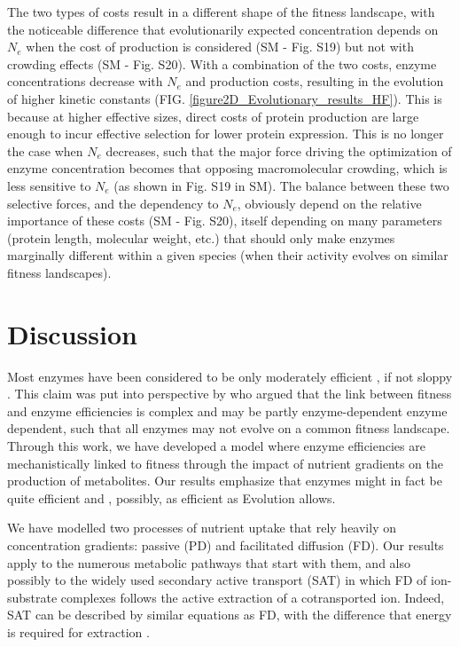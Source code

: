 \documentclass[11pt,onecolumn]{article}
\providecommand{\DIFadd}[1]{{\protect\color{blue} \sf #1}} %
\providecommand{\DIFdel}[1]{{\protect\color{red} \scriptsize #1}} %
\providecommand{\DIFaddbegin}{} %
\providecommand{\DIFaddend}{} %
\providecommand{\DIFdelbegin}{} %
\providecommand{\DIFdelend}{} %
\begin{document}
\DIFadd{The two types of costs result in a different shape of the fitness landscape, with the noticeable difference that evolutionarily expected concentration depends on $N_e$ when the cost of production is considered (SM - Fig. S19) but not with crowding effects (SM - Fig. S20). With a combination of the two costs, enzyme concentrations decrease with $N_e$ and production costs, resulting in the evolution of higher kinetic constants (FIG. \ref{figure2D_Evolutionary_results_HF}). This is because at higher effective sizes, direct costs of protein production are large enough to incur effective selection for lower protein expression. This is no longer the case when $N_e$ decreases, such that the major force driving the optimization of enzyme concentration becomes that opposing macromolecular crowding, which is less sensitive to $N_e$ (as shown in Fig. S19 in SM). The balance between these two selective forces, and the dependency to $N_e$, obviously depend on the relative importance of these costs (SM - Fig. S20), itself depending on many parameters (protein length, molecular weight, etc.) that should only make enzymes marginally different within a given species (when their activity evolves on similar fitness landscapes).
}

\DIFaddend \section{Discussion\label{sec:Discussion}}

Most enzymes have been considered to be only moderately efficient \DIFaddbegin \DIFadd{\citep{Bar-Even11}}\DIFaddend , if not sloppy \DIFdelbegin \DIFdel{\citep{Bar-Even11,Bar-Even15}}\DIFdelend \DIFaddbegin \DIFadd{\citep{Bar-Even15}}\DIFaddend . This claim was put into perspective by \citet{Newton18} who argued that the link between fitness and enzyme efficiencies is complex and may be partly \DIFdelbegin \DIFdel{enzyme-dependent}\DIFdelend \DIFaddbegin \DIFadd{enzyme dependent, such that all enzymes may not evolve on a common fitness landscape}\DIFaddend . Through this work, we have developed a model where enzyme efficiencies are mechanistically linked to fitness through the impact of nutrient gradients on the production of metabolites. Our results emphasize that \DIFdelbegin \DIFdel{enzymes might in fact be quite efficient and , possibly, as efficient as Evolution allows. 
}%

\DIFdel{We have modelled two processes of nutrient uptake that rely heavily on concentration gradients: passive (PD) and facilitated diffusion (FD). Our results apply to the numerous metabolic pathways that start with them, and also possibly to the widely used secondary active transport (SAT) in which FD of ion-substrate complexes follows the active extraction of a cotransported ion.
Indeed, SAT can be described by similar equations as FD, with the difference that energy is required for extraction \citep{Stein86e}.
}%
\end{document}
